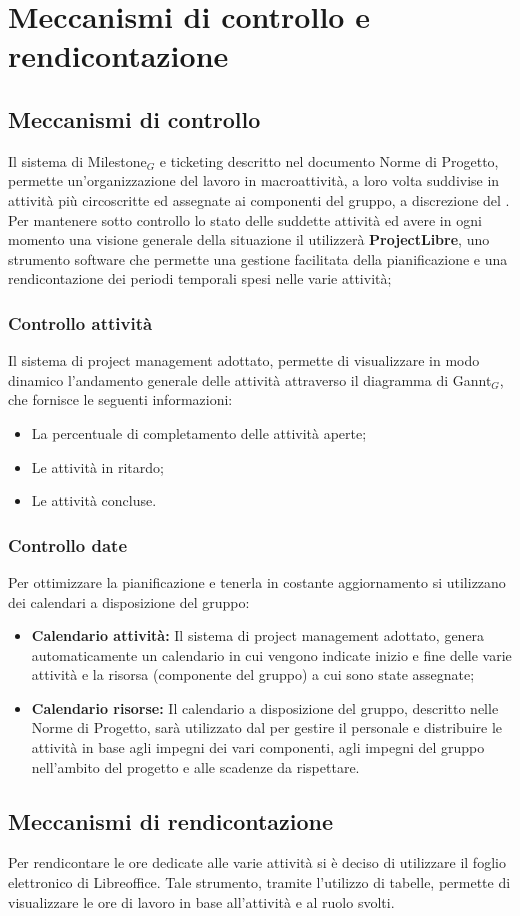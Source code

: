 
\section{Meccanismi di controllo e rendicontazione}

\subsection{Meccanismi di controllo}
Il sistema di Milestone$_G$ e ticketing descritto nel documento Norme di Progetto, permette un'organizzazione del lavoro in macroattività, a loro volta suddivise in attività più circoscritte ed assegnate ai componenti del gruppo, a discrezione del \ruoloResponsabile.
Per mantenere sotto controllo lo stato delle suddette attività ed avere in ogni momento una visione generale della situazione il \ruoloResponsabile{} utilizzerà \textbf{ProjectLibre}, uno strumento software che permette una gestione facilitata della pianificazione e una rendicontazione dei periodi temporali spesi nelle varie attività;

\subsubsection{Controllo attività}

Il sistema di project management adottato, permette di visualizzare in modo dinamico l'andamento generale delle attività attraverso il diagramma di Gannt$_G$, che fornisce le seguenti informazioni:
\begin{itemize}
\item La percentuale di completamento delle attività aperte;
\item Le attività in ritardo;
\item Le attività concluse.
\end{itemize}

\subsubsection{Controllo date}
Per ottimizzare la pianificazione e tenerla in costante aggiornamento si utilizzano dei calendari a disposizione del gruppo:
\begin{itemize}
\item \textbf{Calendario attività:} Il sistema di project management adottato, genera automaticamente un calendario in cui vengono indicate inizio e fine delle varie attività e la risorsa (componente del gruppo) a cui sono state assegnate;
\item \textbf{Calendario risorse:} Il calendario a disposizione del gruppo, descritto nelle Norme di Progetto, sarà utilizzato dal \ruoloResponsabile{} per gestire il personale e distribuire le attività in base agli impegni dei vari componenti, agli impegni del gruppo nell'ambito del progetto e alle scadenze da rispettare.
\end{itemize}

\subsection{Meccanismi di rendicontazione}
Per rendicontare le ore dedicate alle varie attività si è deciso di utilizzare il foglio elettronico di Libreoffice. Tale strumento, tramite l'utilizzo di tabelle, permette di visualizzare le ore di lavoro in base all'attività e al ruolo svolti.

\newpage

